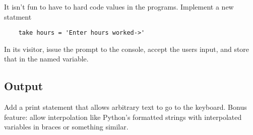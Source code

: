 It isn't fun to have to hard code values in the programs. Implement
a new statment

{\footnotesize
\begin{verbatim}
    take hours = 'Enter hours worked->'
\end{verbatim}
}

In its visitor, issue the prompt to the console, accept the users
input, and store that in the named variable.

\subsection{Output}

Add a print statement that allows arbitrary text to go to the keyboard.
Bonus feature: allow interpolation like Python's formatted strings
with interpolated variables in braces or something similar.
